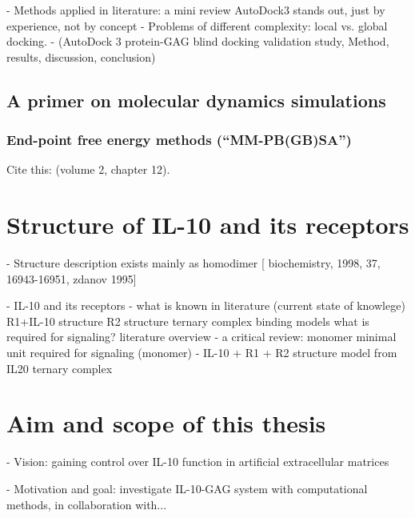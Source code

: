     - Methods applied in literature: a mini review
        AutoDock3 stands out, just by experience, not by concept
    - Problems of different complexity: local vs. global docking.
    - (AutoDock 3 protein-GAG blind docking validation study,
        Method, results, discussion, conclusion)

\lipsum[1-5]

\subsection{A primer on molecular dynamics simulations}

\lipsum[1-5]

\subsubsection{End-point free energy methods (\enquote{MM-PB(GB)SA})}
\label{methods:mmpbsa_mmgbsa}


Cite this: \cite{schlick_innovationsdynamics_2012} (volume 2, chapter 12).

\lipsum[1-5]

\section{Structure of IL-10 and its receptors}

    - Structure description
        exists mainly as homodimer [
            biochemistry, 1998, 37, 16943-16951, zdanov 1995]


    - IL-10 and its receptors
        - what is known in literature (current state of knowlege)
            R1+IL-10 structure
            R2 structure
            ternary complex binding models
            what is required for signaling? literature overview
        - a critical review: monomer
            minimal unit required for signaling (monomer)
        - IL-10 + R1 + R2 structure model from IL20 ternary complex


\section{Aim and scope of this thesis}

- Vision: gaining control over IL-10 function in artificial extracellular matrices

- Motivation and goal: investigate IL-10-GAG system with computational
      methods, in collaboration with...

